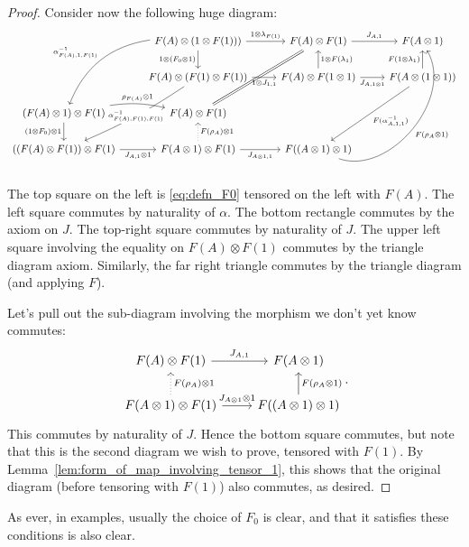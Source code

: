 \documentclass[a4paper,11pt]{article}
\theoremstyle{plain}
\theoremstyle{remark}
\begin{document}
\begin{proof}
Consider now the following huge diagram:
\[ \begin{tikzcd}
  & F(A) \otimes (1 \otimes F(1))) \ar[r, "1\otimes\lambda_{F(1)}"] \ar[d, "1\otimes(F_0\otimes 1)"']
    \ar[ldd, bend right=30, "\alpha_{F(A),1,F(1)}^{-1}"']
      & F(A) \otimes F(1)  \ar[r, "J_{A,1}"]   \ar[ldd, equal]  & F(A\otimes 1) \\
  & F(A) \otimes(F(1) \otimes F(1)) \ar[r, "1 \otimes J_{1,1}"'] \ar[ldd, bend left=5, "\alpha_{F(A),F(1),F(1)}^{-1}" description]
      & F(A) \otimes F(1\otimes 1) \ar[u, "1\otimes F(\lambda_1)"'] \ar[r, "J_{A,1\otimes 1}"']  &  F(A\otimes (1\otimes 1)) 
        \ar[ldd, "F(\alpha_{A,1,1}^{-1})"] \ar[u, "F(1\otimes\lambda_1)"]   \\
  (F(A)\otimes 1)\otimes F(1) \ar[d, "(1\otimes F_0)\otimes 1"'] \ar[r, bend left=10, "\rho_{F(A)}\otimes 1"]
         & F(A) \otimes F(1) \\
  ((F(A)\otimes F(1)) \otimes F(1) \ar[r, "J_{A,1}\otimes 1"']  & F(A\otimes 1) \otimes F(1)  \ar[u, dotted, "F(\rho_A)\otimes 1"']
    \ar[r, "J_{A\otimes 1,1}"'] & F((A\otimes 1)\otimes 1)  \ar[ruuu, bend right=70, "F(\rho_A\otimes 1)"']
\end{tikzcd} \]
The top square on the left is \eqref{eq:defn_F0} tensored on the left with $F(A)$.  The left square commutes by naturality of $\alpha$.  The bottom rectangle commutes by the axiom on $J$.  The top-right square commutes by naturality of $J$.  The upper left square involving the equality on $F(A)\otimes F(1)$ commutes by the triangle diagram axiom.  Similarly, the far right triangle commutes by the triangle diagram (and applying $F$).

Let's pull out the sub-diagram involving the morphism we don't yet know commutes:
\[ \begin{tikzcd}
F(A)\otimes F(1) \ar[r, "J_{A,1}"]  & F(A\otimes 1)   \\
F(A\otimes 1)\otimes F(1) \ar[u, dotted, "F(\rho_A)\otimes 1"'] \ar[r, "J_{A\otimes 1}\otimes 1"]
& F((A\otimes 1)\otimes 1) \ar[u, "F(\rho_A\otimes 1)"']
\end{tikzcd}. \]
This commutes by naturality of $J$.  Hence the bottom square commutes, but note that this is the second diagram we wish to prove, tensored with $F(1)$.  By Lemma~\ref{lem:form_of_map_involving_tensor_1}, this shows that the original diagram (before tensoring with $F(1)$) also commutes, as desired.
\end{proof}

As ever, in examples, usually the choice of $F_0$ is clear, and that it satisfies these conditions is also clear.
\end{document}
